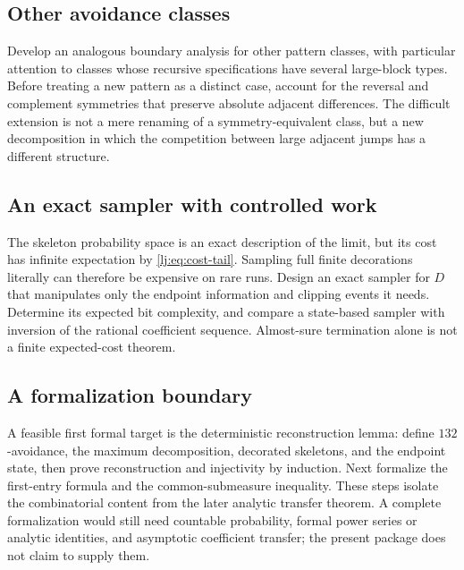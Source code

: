 \documentclass[11pt,a4paper]{article}
\theoremstyle{definition}\newaliascnt{definition}{theorem}
\theoremstyle{remark}\newaliascnt{remark}{theorem}
\begin{document}
\subsection{Other avoidance classes}
Develop an analogous boundary analysis for other pattern classes, with
particular attention to classes whose recursive specifications have
several large-block types. Before treating a new pattern as a distinct
case, account for the reversal and complement symmetries that preserve
absolute adjacent differences. The difficult extension is not a mere
renaming of a symmetry-equivalent class, but a new decomposition in which
the competition between large adjacent jumps has a different structure.

\subsection{An exact sampler with controlled work}
The skeleton probability space is an exact description of the limit, but
its cost has infinite expectation by \eqref{lj:eq:cost-tail}. Sampling full
finite decorations literally can therefore be expensive on rare runs.
Design an exact sampler for $D$ that manipulates only the endpoint
information and clipping events it needs. Determine its expected bit
complexity, and compare a state-based sampler with inversion of the
rational coefficient sequence. Almost-sure termination alone is not a
finite expected-cost theorem.

\subsection{A formalization boundary}
A feasible first formal target is the deterministic reconstruction lemma:
define $132$-avoidance, the maximum decomposition, decorated skeletons,
and the endpoint state, then prove reconstruction and injectivity by
induction. Next formalize the first-entry formula and the common-submeasure
inequality. These steps isolate the combinatorial content from the later
analytic transfer theorem. A complete formalization would still need
countable probability, formal power series or analytic identities, and
asymptotic coefficient transfer; the present package does not claim to
supply them.
\end{document}

